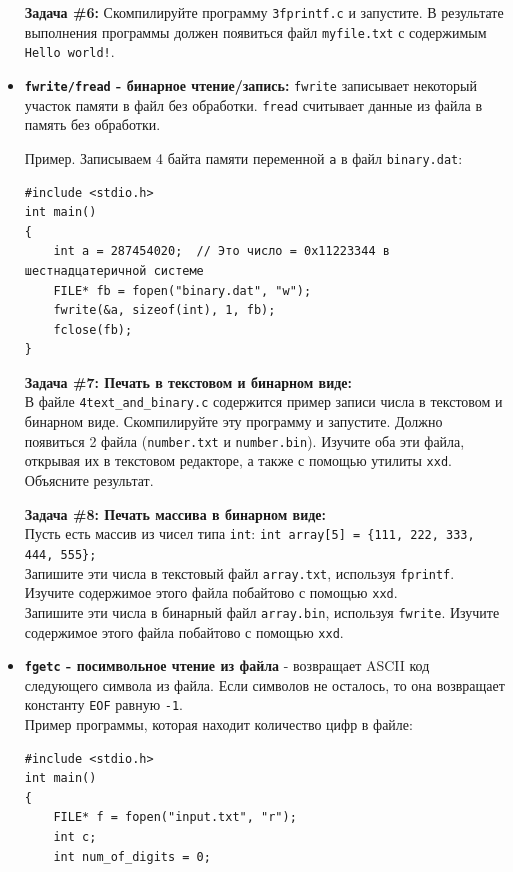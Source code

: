 \documentclass{article}
\begin{document}
\begin{itemize}
\textbf{Задача \#6:} Скомпилируйте программу \texttt{3fprintf.c} и запустите. В результате выполнения программы должен появиться файл \texttt{myfile.txt} с содержимым \texttt{Hello world!}.


\item \textbf{\texttt{fwrite/fread} - бинарное чтение/запись:} \texttt{fwrite} записывает некоторый участок памяти в файл без обработки. \texttt{fread} считывает данные из файла в память без обработки.

Пример. Записываем 4 байта памяти переменной \texttt{a} в файл \texttt{binary.dat}:
\begin{lstlisting}
#include <stdio.h>
int main()
{
	int a = 287454020;  // Это число = 0x11223344 в шестнадцатеричной системе
	FILE* fb = fopen("binary.dat", "w");
	fwrite(&a, sizeof(int), 1, fb);
	fclose(fb);
}
\end{lstlisting}
\textbf{Задача \#7: Печать в текстовом и бинарном виде:}\\
В файле \texttt{4text\_and\_binary.c} содержится пример записи числа в текстовом и бинарном виде. Скомпилируйте эту программу и запустите. Должно появиться 2 файла (\texttt{number.txt} и \texttt{number.bin}). Изучите оба эти файла, открывая их в текстовом редакторе, а также с помощью утилиты \texttt{xxd}. Объясните результат.


\textbf{Задача \#8: Печать массива в бинарном виде:}\\
Пусть есть массив из чисел типа \texttt{int}: \texttt{int array[5] = \{111, 222, 333, 444, 555\};}\\
Запишите эти числа в текстовый файл \texttt{array.txt}, используя \texttt{fprintf}. Изучите содержимое этого файла побайтово с помощью \texttt{xxd}.\\
Запишите эти числа в бинарный файл \texttt{array.bin}, используя \texttt{fwrite}. Изучите содержимое этого файла побайтово с помощью \texttt{xxd}.



\item \textbf{\texttt{fgetc} - посимвольное чтение из файла} - возвращает ASCII код следующего символа из файла. Если символов не осталось, то она возвращает константу \texttt{EOF} равную \texttt{-1}.\\
Пример программы, которая находит количество цифр в файле:
\begin{lstlisting}
#include <stdio.h>
int main()
{
    FILE* f = fopen("input.txt", "r");
    int c; 
    int num_of_digits = 0;


\end{lstlisting}
\end{itemize}
\end{document}
